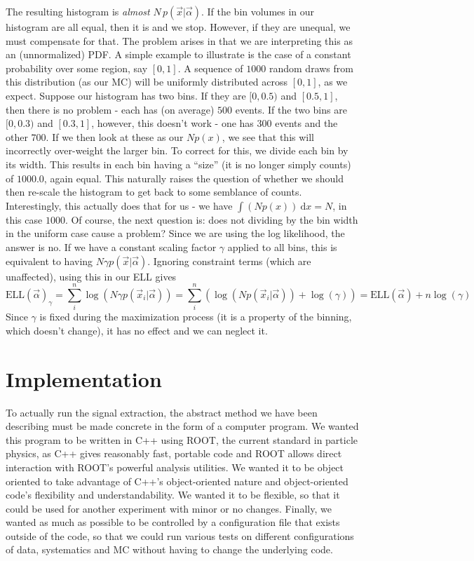The resulting histogram is \emph{almost} $N\, p(\vec{x}|\vec{\alpha})$.
If the bin volumes in our histogram are all equal, then it is and
we stop.  However, if they are unequal, we must compensate for
that.  The problem arises in that we are interpreting this as an
(unnormalized) PDF.  A simple example to illustrate is the case of a
constant probability over some region, say $[0,1]$.  A sequence of
$1000$ random draws from this distribution (as our MC) will be
uniformly distributed across $[0,1]$, as we expect.  Suppose our histogram
has two bins.  If they are $[0,0.5)$ and $[0.5,1]$, then there is no
problem - each has (on average) $500$ events.  If the two bins are
$[0,0.3)$ and $[0.3,1]$, however, this doesn't work - one has $300$
events and the other $700$.  If we then look at these as our $N p(x)$,
we see that this will incorrectly over-weight the larger bin.  To
correct for this, we divide each bin by its width.  This results
in each bin having a ``size'' (it is no longer simply counts) of
$1000.0$, again equal.  This naturally raises the question of whether
we should then re-scale the histogram to get back to some semblance of
counts.  Interestingly, this actually does that for us - we have $\int
(N p(x)) \: \mathrm{d}x = N$, in this case $1000$.  Of course, the
next question is: does not dividing by the bin width in the uniform
case cause a problem?  Since we are using the log likelihood, the
answer is no.  If we have a constant scaling factor $\gamma$ applied
to all bins, this is equivalent to having $N \gamma
p(\vec{x}|\vec{\alpha})$.  Ignoring constraint terms (which are
unaffected), using this in our ELL gives
\begin{equation}
\mathrm{ELL}(\vec{\alpha})_{\gamma} = 
\sum_i^n \log(N \gamma p(\vec{x}_i|\vec{\alpha})) = 
\sum_i^n (\log(N p(\vec{x}_i|\vec{\alpha})) + \log(\gamma)) =
\mathrm{ELL}(\vec{\alpha}) + n \log(\gamma)
\end{equation}
Since $\gamma$ is fixed during the maximization process (it is a
property of the binning, which doesn't change), it has no effect and
we can neglect it.


\section{Implementation}
To actually run the signal extraction, the abstract method we have
been describing must be made concrete in the form of a computer
program.  We wanted this program to be written in C++ using ROOT, the
current standard in particle physics, as C++ gives reasonably fast,
portable code and ROOT allows direct interaction with ROOT's powerful
analysis utilities.  We wanted it to be object oriented to take
advantage of C++'s object-oriented nature and object-oriented code's
flexibility and understandability.  We wanted it to be flexible, so
that it could be used for another experiment with minor or no changes.
Finally, we wanted as much as possible to be controlled by a
configuration file that exists outside of the code, so that we could
run various tests on different configurations of data, systematics and
MC without having to change the underlying code.

